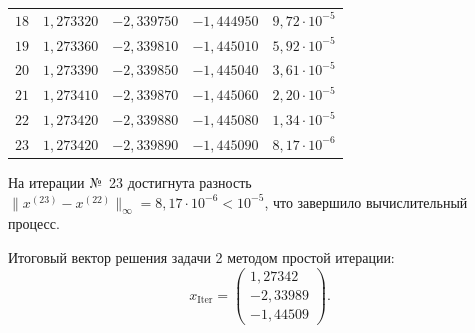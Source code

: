 \begin{table}[H]
\begin{tabular}{|c|c|c|c|c|}
        $18$ & $1{,}273320$ & $-2{,}339750$ & $-1{,}444950$ & $9{,}72 \cdot 10^{-5}$ \\
        $19$ & $1{,}273360$ & $-2{,}339810$ & $-1{,}445010$ & $5{,}92 \cdot 10^{-5}$ \\
        $20$ & $1{,}273390$ & $-2{,}339850$ & $-1{,}445040$ & $3{,}61 \cdot 10^{-5}$ \\
        $21$ & $1{,}273410$ & $-2{,}339870$ & $-1{,}445060$ & $2{,}20 \cdot 10^{-5}$ \\
        $22$ & $1{,}273420$ & $-2{,}339880$ & $-1{,}445080$ & $1{,}34 \cdot 10^{-5}$ \\
        $23$ & $1{,}273420$ & $-2{,}339890$ & $-1{,}445090$ & $8{,}17 \cdot 10^{-6}$ \\
        \hline
    \end{tabular}
\end{table}

На итерации №~23 достигнута разность $\|x^{(23)} - x^{(22)}\|_\infty = 8{,}17 \cdot 10^{-6} < 10^{-5}$, что завершило вычислительный процесс.

Итоговый вектор решения задачи 2 методом простой итерации:
\begin{equation}
    x_{\text{Iter}} = \begin{pmatrix} 1{,}27342 \\ -2{,}33989 \\ -1{,}44509 \end{pmatrix}.
    \label{eq:sol_iter}
\end{equation}
